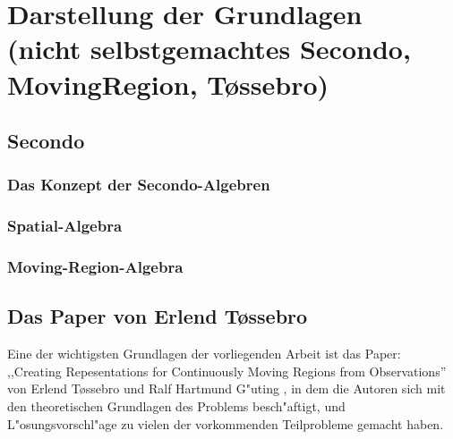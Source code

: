 
\chapter[Darstellung der Grundlagen \anmerkung{30-40 Seiten}]{Darstellung der Grundlagen\\
\normalsize{(nicht selbstgemachtes
Secondo,
MovingRegion,
T\o{}ssebro)}} \label{Kapitel2}
\minitoc
\newpage
\section{Secondo }
\subsection{Das Konzept der Secondo-Algebren}
\subsection{Spatial-Algebra}
\subsection{Moving-Region-Algebra}

\section{Das Paper von Erlend T\o{}ssebro }

Eine der wichtigsten Grundlagen der vorliegenden Arbeit ist das Paper: ,,Creating Repesentations for Continuously Moving Regions from Observations'' von Erlend T\o{}ssebro und Ralf Hartmund G"uting \cite{TG}, in dem die Autoren sich mit den theoretischen Grundlagen des Problems besch"aftigt, und L"osungsvorschl"age zu vielen der vorkommenden Teilprobleme gemacht haben.

